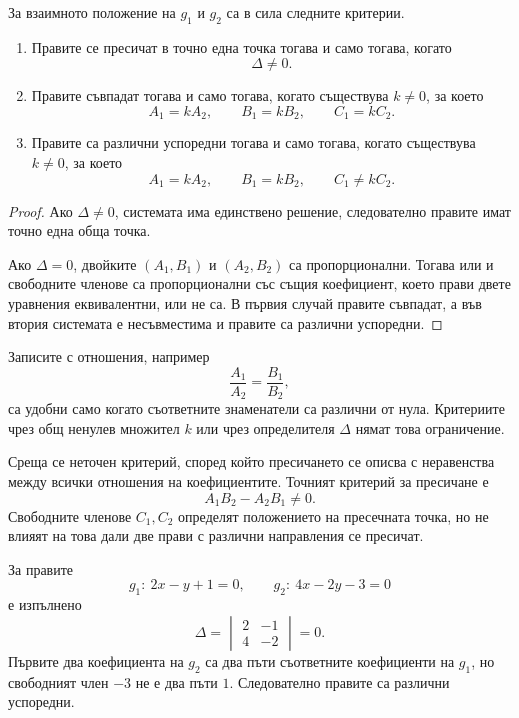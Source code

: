 \begin{keythm}
За взаимното положение на $g_1$ и $g_2$ са в сила следните критерии.

\begin{enumerate}
 \item Правите се пресичат в точно една точка тогава и само тогава,
 когато
 \[
 \Delta\neq0.
 \]

 \item Правите съвпадат тогава и само тогава, когато съществува
 $k\neq0$, за което
 \[
 A_1=kA_2,\qquad B_1=kB_2,\qquad C_1=kC_2.
 \]

 \item Правите са различни успоредни тогава и само тогава, когато
 съществува $k\neq0$, за което
 \[
 A_1=kA_2,\qquad B_1=kB_2,\qquad C_1\neq kC_2.
 \]
\end{enumerate}
\end{keythm}

\begin{proof}
Ако $\Delta\neq0$, системата има единствено решение, следователно
правите имат точно една обща точка.

Ако $\Delta=0$, двойките $(A_1,B_1)$ и $(A_2,B_2)$ са пропорционални.
Тогава или и свободните членове са пропорционални със същия коефициент,
което прави двете уравнения еквивалентни, или не са. В първия случай
правите съвпадат, а във втория системата е несъвместима и правите са
различни успоредни.
\end{proof}

\begin{remark}
Записите с отношения, например
\[
 \frac{A_1}{A_2}=\frac{B_1}{B_2},
\]
са удобни само когато съответните знаменатели са различни от нула.
Критериите чрез общ ненулев множител $k$ или чрез определителя
$\Delta$ нямат това ограничение.
\end{remark}

\begin{supp}[Бележка]
Среща се неточен критерий, според който пресичането се описва с
неравенства между всички отношения на коефициентите. Точният критерий
за пресичане е
\[
 A_1B_2-A_2B_1\neq0.
\]
Свободните членове $C_1,C_2$ определят положението на пресечната точка,
но не влияят на това дали две прави с различни направления се
пресичат.
\end{supp}

\begin{example}
За правите
\[
 g_1:\ 2x-y+1=0,\qquad
 g_2:\ 4x-2y-3=0
\]
е изпълнено
\[
 \Delta=
 \begin{vmatrix}
 2&-1\\
 4&-2
 \end{vmatrix}=0.
\]
Първите два коефициента на $g_2$ са два пъти съответните коефициенти на
$g_1$, но свободният член $-3$ не е два пъти $1$. Следователно правите
са различни успоредни.
\end{example}

